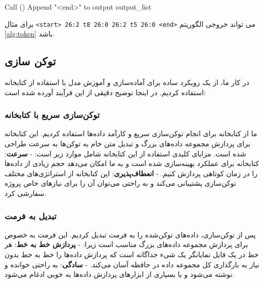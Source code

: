 \begin{LTR}
\begin{algorithm}
\begin{algorithmic}[1]
                  \State Call ()
                  \State Append "<end>" to output
                  \State \Return output\_list
                  \EndFunction
            \end{algorithmic}
      \end{algorithm}
\end{LTR}

\begin{example}[]
      \centering
      \label{example:token}
      برای مثال \texttt{<start> 26:2 t8 26:0 26:2 t5 26:0 <end>} می تواند خروجی الگوریتم \ref{alg:token} باشد.
\end{example}

\subsection{توکن سازی}

در کار ما، از یک رویکرد ساده برای آماده‌سازی و آموزش مدل با استفاده از
کتابخانه  \cite{Moi_HuggingFace_s_Tokenizers_2023} استفاده کردیم. در اینجا توضیح دقیقی از این فرآیند
آورده شده است:

\subsubsection{توکن‌سازی سریع با کتابخانه }

ما از کتابخانه  برای انجام توکن‌سازی سریع و کارآمد داده‌ها
استفاده کردیم. این کتابخانه برای پردازش مجموعه داده‌های بزرگ و تبدیل متن
خام به توکن‌ها به سرعت طراحی شده است. مزایای کلیدی استفاده از این
کتابخانه شامل موارد زیر است: - \textbf{سرعت}: کتابخانه  برای
عملکرد بهینه‌سازی شده است و به ما امکان می‌دهد حجم زیادی از داده‌ها را در
زمان کوتاهی پردازش کنیم. - \textbf{انعطاف‌پذیری}: این کتابخانه از
استراتژی‌های مختلف توکن‌سازی پشتیبانی می‌کند و به راحتی می‌توان آن را برای
نیازهای خاص پروژه سفارشی کرد.

\subsubsection{تبدیل به فرمت }

پس از توکن‌سازی، داده‌های توکن‌شده را به فرمت  تبدیل
کردیم. این فرمت به خصوص برای پردازش مجموعه داده‌های بزرگ مناسب است زیرا:
- \textbf{پردازش خط به خط}: هر خط در یک فایل  نمایانگر یک شیء 
جداگانه است که پردازش داده‌ها را خط به خط بدون نیاز به بارگذاری کل مجموعه
داده در حافظه آسان می‌کند. - \textbf{سادگی}:  به راحتی خوانده و
نوشته می‌شود و با بسیاری از ابزارهای پردازش داده‌ها به خوبی ادغام می‌شود.

